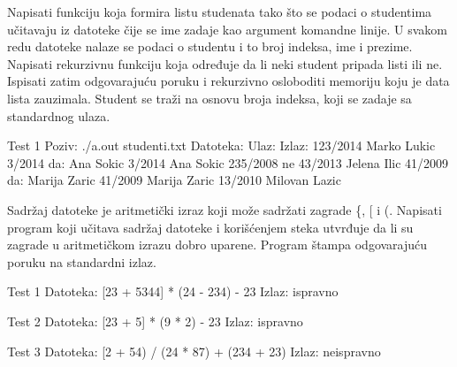 \begin{Exercise}[label=608]
Napisati funkciju koja formira listu studenata tako što se podaci o studentima 
učitavaju iz datoteke čije se ime zadaje kao argument komandne linije. 
U svakom redu datoteke nalaze se podaci o studentu i to broj indeksa, ime
i prezime. Napisati rekurzivnu funkciju koja određuje da li neki student pripada listi ili ne.
Ispisati zatim odgovarajuću poruku i rekurzivno osloboditi memoriju koju je data lista zauzimala.
Student se traži na osnovu broja indeksa, koji se zadaje sa standardnog ulaza.
\begin{maxitest}
    \begin{test}{Test 1}
Poziv: ./a.out studenti.txt
Datoteka:                 Ulaz:       Izlaz:
123/2014 Marko Lukic      3/2014      da: Ana Sokic
3/2014 Ana Sokic          235/2008    ne
43/2013 Jelena Ilic       41/2009     da: Marija Zaric
41/2009 Marija Zaric
13/2010 Milovan Lazic
  \end{test}
\end{maxitest}

\end{Exercise}
\begin{Answer}[ref=608]
\end{Answer}


\begin{Exercise}[label=608]
Sadržaj datoteke je aritmetički izraz koji može sadržati zagrade \{, [ i (. 
Napisati program koji učitava sadržaj datoteke i korišćenjem steka 
utvrđuje da li su zagrade u aritmetičkom izrazu 
dobro uparene. Program štampa odgovarajuću poruku na standardni izlaz.

\begin{maxitest}
  \begin{test}{Test 1}
Datoteka: {[23 + 5344] * (24 - 234)} - 23
Izlaz:  ispravno
  \end{test}
  \begin{test}{Test 2}
Datoteka: {[23 + 5] * (9 * 2)} - {23}
Izlaz:  ispravno
  \end{test}
  \begin{test}{Test 3}
Datoteka: {[2 + 54) / (24 * 87)} + (234 + 23)
Izlaz:  neispravno
  \end{test}
\end{maxitest}

\end{Exercise}
\begin{Answer}[ref=608]
\end{Answer}

